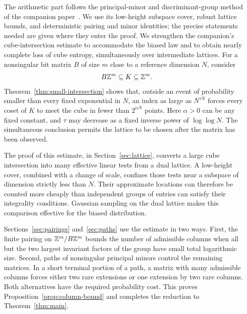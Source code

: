 The arithmetic part follows the principal-minor and discriminant-group
method of the companion paper~\cite{SymmetricRate}. We use its
low-height subspace cover, robust lattice bounds, and deterministic
pairing and minor identities; the precise statements needed are given
where they enter the proof. We strengthen the companion's cube-intersection estimate to accommodate the biased law and to obtain
nearly complete loss of cube entropy, simultaneously over intermediate
lattices. For a nonsingular bit matrix
$B$ of size $m$ close to a reference dimension $N$, consider
\[
 B\mathbb Z^m\subseteq K\subseteq\mathbb Z^m.
\]
Theorem~\ref{thm:small-intersection} shows that, outside an event of
probability smaller than every fixed exponential in $N$, an index as
large as $N^{\tau N}$ forces every coset of $K$ to meet the cube in
fewer than $2^{\alpha N}$ points. Here $\alpha>0$ can be any fixed
constant, and $\tau$ may decrease as a fixed inverse power of
$\log\log N$. The simultaneous conclusion permits the lattice to be
chosen after the matrix has been observed.

The proof of this estimate, in Section~\ref{sec:lattice}, converts a
large cube intersection into many effective linear tests from a dual
lattice. A low-height cover, combined with a change of scale, confines
those tests near a subspace of
dimension strictly less than $N$. Their approximate locations can
therefore be counted more cheaply than independent groups of entries can satisfy
their integrality conditions. Gaussian sampling on the dual lattice
makes this comparison effective for the biased distribution.

Sections~\ref{sec:pairings} and~\ref{sec:paths} use the estimate in
two ways. First, the finite pairing on $\mathbb Z^m/B\mathbb Z^m$ bounds the
number of admissible columns when all but the two largest invariant
factors of the group have small total logarithmic size. Second, paths
of nonsingular principal minors control the
remaining matrices. In a short terminal portion of a path, a matrix
with many admissible columns forces either two rare extensions or one
extension by two rare columns. Both alternatives have the required
probability cost. This proves Proposition~\ref{prop:column-bound}
and completes the reduction to Theorem~\ref{thm:main}.
